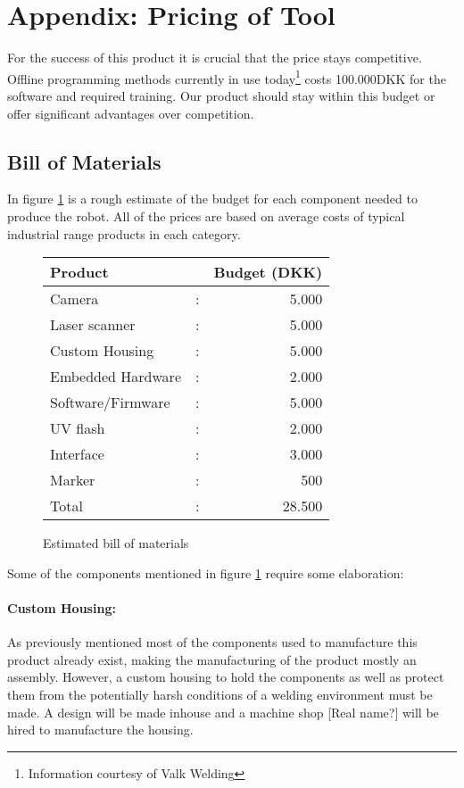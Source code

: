 \section{Appendix: Pricing of Tool}
\label{app:priceofProduct}
For the success of this product it is crucial that the price stays competitive. Offline programming methods currently in use today\footnote{Information courtesy of Valk Welding} costs 100.000DKK for the software and required training. Our product should stay within this budget or offer significant advantages over competition.
\subsection{Bill of Materials}
In figure \ref{tab:BoM} is a rough estimate of the budget for each component needed to produce the robot. All of the prices are based on average costs of typical industrial range products in each category.  

\begin{figure}[h]
	\begin{center}
		\begin{tabular}{l c r}
		Product            & & Budget (DKK)\\
		\hline
		Camera 				& : & 5.000  \\
		Laser scanner		& : & 5.000 \\
		Custom Housing		& : & 5.000\\
		Embedded Hardware	& : & 2.000\\
		Software/Firmware	& : & 5.000\\
		UV flash			& : & 2.000\\
		Interface			& : & 3.000\\
		Marker				& : & 500\\[0.2cm]
		\hline
		Total				& : & 28.500\\ 
		\end{tabular}
	\end{center}
	\caption{Estimated bill of materials}
\label{tab:BoM}
\end{figure}
Some of the components mentioned in figure \ref{tab:BoM} require some elaboration:
\paragraph{Custom Housing:}
As previously mentioned most of the components used to manufacture this product already exist, making the manufacturing of the product mostly an assembly. However, a custom housing to hold the components as well as protect them from the potentially harsh conditions of a welding environment must be made. A design will be made inhouse and a machine shop [Real name?] will be hired to manufacture the housing.
